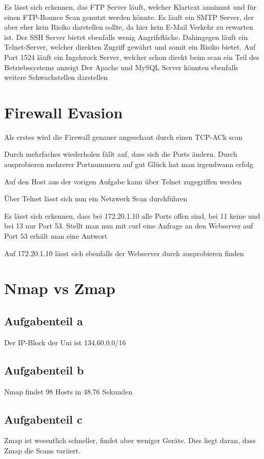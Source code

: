 \documentclass[a4paper,12pt,
headsepline,           %
oneside,               %
pointlessnumbers,      %
bibtotoc,              %
BCOR15mm               %
]{scrbook}
\begin{document}
Es lässt sich erkennen, das FTP Server läuft, welcher Klartext annimmt und für einen FTP-Bounce Scan genutzt werden könnte. Es läuft ein SMTP Server, der aber eher kein Risiko darstellen sollte, da hier kein E-Mail Verkehr zu erwarten ist. Der SSH Server bietet ebenfalls wenig Angrifsfläche. Dahingegen läuft
ein Telnet-Server, welcher direkten Zugriff gewährt und somit ein Risiko bietet. Auf Port 1524 läuft ein Ingelsrock Server, welcher schon direkt beim scan ein Teil des Betriebssystems anzeigt
Der Apache und MySQL Server könnten ebenfalls weitere Schwachstellen darstellen

\section*{Firewall Evasion}
Als erstes wird die Firewall genauer angeschaut durch einen TCP-ACk scan

Durch mehrfaches wiederholen fällt auf, dass sich die Ports ändern. Durch ausprobieren mehrerer Portnummern auf gut Glück hat man irgendwann erfolg

Auf den Host aus der vorigen Aufgabe kann über Telnet zugegriffen werden

Über Telnet lässt sich nun ein Netzwerk Scan durchführen

Es lässt sich erkennen, dass bei 172.20.1.10 alle Ports offen sind, bei 11 keine und bei 13 nur Port 53. Stellt man nun mit curl eine Anfrage an den Webserver auf Port 53 erhält man eine Antwort

Auf 172.20.1.10 lässt sich ebenfalls der Webserver durch ausprobieren finden


\section*{Nmap vs Zmap}
\subsection*{Aufgabenteil a}
Der IP-Block der Uni ist 134.60.0.0/16
\subsection*{Aufgabenteil b}

Nmap findet 98 Hosts in 48.76 Sekunden
\subsection*{Aufgabenteil c}

Zmap ist wesentlich schneller, findet aber weniger Geräte. Dies liegt daran, dass Zmap die Scans variiert.
\end{document}
